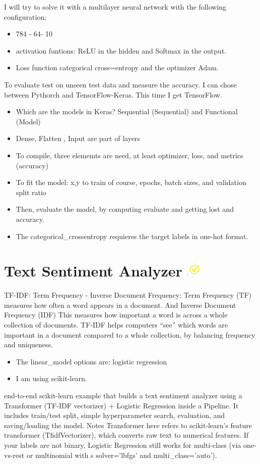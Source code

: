 \documentclass{article}
\begin{document}
I will try to solve it with a multilayer neural network with the following configuration:
\begin{itemize}
    \item 784  - 64- 10
    \item activation funtions: ReLU in the hidden and Softmax in the output.
    \item Loss function categorical cross=entropy and the optimizer Adam.
\end{itemize}
To evaluate test on unseen test data and measure the accuracy.
I can chose between Pythorch and TensorFlow-Keras. This time I get TensorFlow.
\begin{itemize}
    \item Which are the models in Keras? Sequential (Sequential) and Functional (Model)
    \item Dense, Flatten , Input are part of layers
    \item To compile, three elememts are need, at least optimizer, loss, and metrics (accuracy)
    \item To fit the model: x,y to train of course, epochs, batch sizes, and validation split ratio
    \item Then, evaluate the model, by computing evaluate and getting lost and accuracy.
    \item The categorical\_crossentropy requieres the target labels in one-hot format.
\end{itemize}

\section{Text Sentiment Analyzer \includegraphics[width=1em]{yellow.jpeg} }
TF-IDF: Term Frequency - Inverse Document Frequency:
Term Frequency (TF) measures how often a word appears in a document. And Inverse Document Frequency (IDF)
This measures how important a word is across a whole collection of documents.
TF-IDF helps computers “see” which words are important in a document compared to a whole collection, by balancing frequency and uniqueness.

\begin{itemize}
    \item The linear\_model options are: logistic regression
    \item I am using scikit-learn.
\end{itemize}
end-to-end scikit-learn example that builds a text sentiment analyzer using a Transformer (TF-IDF vectorizer) + Logistic Regression inside a Pipeline. It includes train/test split, simple hyperparameter search, evaluation, and saving/loading the model.
Notes
Transformer here refers to scikit-learn’s feature transformer (TfidfVectorizer), which converts raw text to numerical features.
If your labels are not binary, Logistic Regression still works for multi-class (via one-vs-rest or multinomial with s
solver='lbfgs' and multi\_class='auto').
\end{document}

